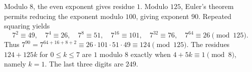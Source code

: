 Modulo $8$, the even exponent gives residue $1$. Modulo $125$, Euler's theorem permits reducing the exponent modulo $100$, giving exponent $90$. Repeated squaring yields
\[
7^2\equiv49,\quad7^4\equiv26,\quad7^8\equiv51,\quad
7^{16}\equiv101,\quad7^{32}\equiv76,\quad7^{64}\equiv26\pmod{125}.
\]
Thus $7^{90}=7^{64+16+8+2}\equiv26\cdot101\cdot51\cdot49\equiv124\pmod{125}$.
The residues $124+125k$ for $0\le k\le7$ are $1$ modulo $8$ exactly when $4+5k\equiv1\pmod8$, namely $k=1$. The last three digits are $\boxed{249}$.
